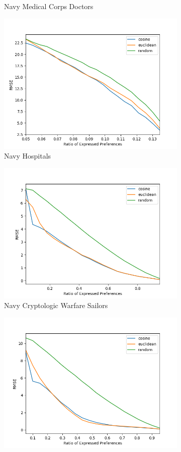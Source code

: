 \begin{figure}
\begin{subfigure}{.5\textwidth}
  \caption{Navy Medical Corps Doctors}
  \label{fig:med_s}
\end{subfigure}
\begin{subfigure}{.5\textwidth}
  \centering
  \includegraphics[width=.8\linewidth]{Sections/Plots/med_o.png}
  \caption{Navy Hospitals}
  \label{fig:med_o}
\end{subfigure}
\begin{subfigure}{.5\textwidth}
  \centering
  \includegraphics[width=.8\linewidth]{Sections/Plots/cw_s.png}
  \caption{Navy Cryptologic Warfare Sailors}
  \label{fig:cw_s}
\end{subfigure}
\begin{subfigure}{.5\textwidth}
  \centering
  \includegraphics[width=.8\linewidth]{Sections/Plots/cw_o.png}

\end{subfigure}
\end{figure}
